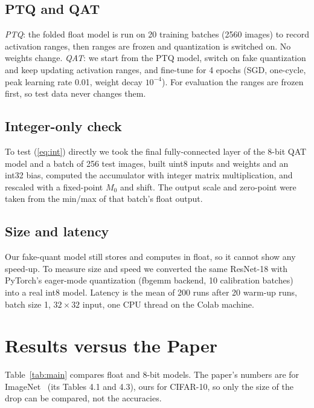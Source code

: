 \documentclass[conference]{IEEEtran}
\begin{document}
\subsection{PTQ and QAT}
\emph{PTQ}: the folded float model is run on 20 training batches (2560 images) to record activation ranges, then ranges are frozen and quantization is switched on. No weights change. \emph{QAT}: we start from the PTQ model, switch on fake quantization and keep updating activation ranges, and fine-tune for 4 epochs (SGD, one-cycle, peak learning rate 0.01, weight decay $10^{-4}$). For evaluation the ranges are frozen first, so test data never changes them.

\subsection{Integer-only check}
To test (\ref{eq:int}) directly we took the final fully-connected layer of the 8-bit QAT model and a batch of 256 test images, built uint8 inputs and weights and an int32 bias, computed the accumulator with integer matrix multiplication, and rescaled with a fixed-point $M_0$ and shift. The output scale and zero-point were taken from the min/max of that batch's float output.

\subsection{Size and latency}
Our fake-quant model still stores and computes in float, so it cannot show any speed-up. To measure size and speed we converted the same ResNet-18 with PyTorch's eager-mode quantization (fbgemm backend, 10 calibration batches) into a real int8 model. Latency is the mean of 200 runs after 20 warm-up runs, batch size 1, $32{\times}32$ input, one CPU thread on the Colab machine.

\section{Results versus the Paper}
Table~\ref{tab:main} compares float and 8-bit models. The paper's numbers are for ImageNet~\cite{jacob2018} (its Tables 4.1 and 4.3), ours for CIFAR-10, so only the size of the drop can be compared, not the accuracies.
\end{document}
